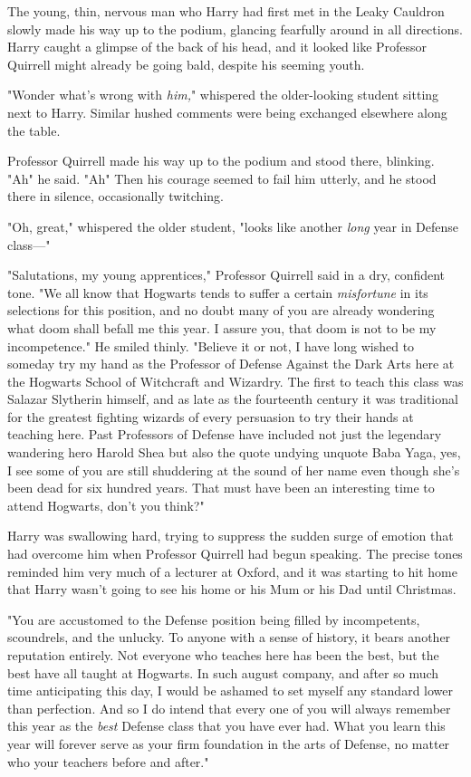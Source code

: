The young, thin, nervous man who Harry had first met in the Leaky Cauldron
slowly made his way up to the podium, glancing fearfully around in all
directions. Harry caught a glimpse of the back of his head, and it looked like
Professor Quirrell might already be going bald, despite his seeming youth.

"Wonder what's wrong with \emph{him,}" whispered the older-looking student
sitting next to Harry. Similar hushed comments were being exchanged elsewhere
along the table.

Professor Quirrell made his way up to the podium and stood there, blinking.
"Ah{\el}" he said. "Ah{\el}" Then his courage seemed to fail him utterly,
and he stood there in silence, occasionally twitching.

"Oh, great," whispered the older student, "looks like another \emph{long} year
in Defense class—"

"Salutations, my young apprentices," Professor Quirrell said in a dry,
confident tone. "We all know that Hogwarts tends to suffer a certain
\emph{misfortune} in its selections for this position, and no doubt many of you
are already wondering what doom shall befall me this year. I assure you, that
doom is not to be my incompetence." He smiled thinly. "Believe it or not, I
have long wished to someday try my hand as the Professor of Defense Against the
Dark Arts here at the Hogwarts School of Witchcraft and Wizardry. The first to
teach this class was Salazar Slytherin himself, and as late as the fourteenth
century it was traditional for the greatest fighting wizards of every
persuasion to try their hands at teaching here. Past Professors of Defense have
included not just the legendary wandering hero Harold Shea but also the quote
undying unquote Baba Yaga, yes, I see some of you are still shuddering at the
sound of her name even though she's been dead for six hundred years. That must
have been an interesting time to attend Hogwarts, don't you think?"

Harry was swallowing hard, trying to suppress the sudden surge of emotion that
had overcome him when Professor Quirrell had begun speaking. The precise tones
reminded him very much of a lecturer at Oxford, and it was starting to hit home
that Harry wasn't going to see his home or his Mum or his Dad until Christmas.

"You are accustomed to the Defense position being filled by incompetents,
scoundrels, and the unlucky. To anyone with a sense of history, it bears
another reputation entirely. Not everyone who teaches here has been the best,
but the best have all taught at Hogwarts. In such august company, and after so
much time anticipating this day, I would be ashamed to set myself any standard
lower than perfection. And so I do intend that every one of you will always
remember this year as the \emph{best} Defense class that you have ever had.
What you learn this year will forever serve as your firm foundation in the arts
of Defense, no matter who your teachers before and after."

